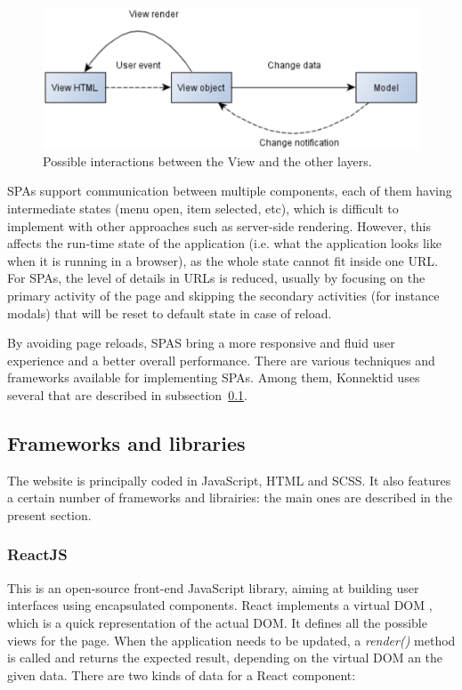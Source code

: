 \begin{figure}[H]
    \centering
    \includegraphics{figure/view.png}
    \caption{Possible interactions between the View and the other layers.}
    \label{fig:view}
\end{figure}

SPAs support communication between multiple components, each of them having intermediate states (menu open, item selected, etc), which is difficult to
implement with other approaches such as server-side rendering. However, this affects the run-time state of the application (i.e. what the application looks like when it is
running in a browser), as the whole state cannot fit inside one URL. For SPAs, the level of details in URLs is reduced, usually by focusing on the primary activity
of the page and skipping the secondary activities (for instance modals) that will be reset to default state in case of reload.

By avoiding page reloads, SPAS bring a more responsive and fluid user experience and a better overall performance.
There are various techniques and frameworks available for implementing SPAs.
Among them, Konnektid uses several that are described in {\sc subsection}~\ref{ssec:frameworks}.

\subsection{Frameworks and libraries}
\label{ssec:frameworks}

The website is principally coded in JavaScript, HTML and SCSS. It also features a certain number of frameworks and librairies: the main ones are described
in the present section.

\subsubsection{ReactJS}
\label{sssec:react}

This is an open-source front-end JavaScript library, aiming at building user interfaces using encapsulated components. React implements a
\guillemotleft{} virtual DOM \guillemotright{}, which is a quick representation of the actual DOM. It defines all the possible views for the page.
When the application needs to be updated, a \textit{render()} method is called and returns the expected result, depending on the virtual DOM an the given data.
There are two kinds of data for a React component:

